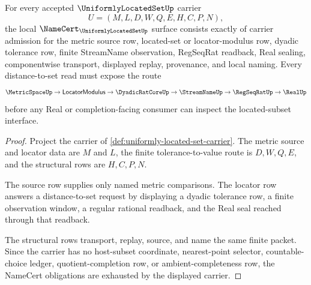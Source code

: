\begin{theorem}
\label{thm:uniformly-located-set-namecert-obligations}
For every accepted $\UniformlyLocatedSetUp$ carrier
$$
U=(M,L,D,W,Q,E,H,C,P,N),
$$
the local $\NameCert_{\UniformlyLocatedSetUp}$ surface consists exactly of carrier admission for the metric source row, located-set or locator-modulus row, dyadic tolerance row, finite StreamName observation, RegSeqRat readback, Real sealing, componentwise transport, displayed replay, provenance, and local naming. Every distance-to-set read must expose the route
$$
\MetricSpaceUp \to \mathsf{LocatorModulus} \to \DyadicRatCoreUp \to \StreamNameUp \to \RegSeqRatUp \to \RealUp
$$
before any Real or completion-facing consumer can inspect the located-subset interface.
\end{theorem}
\begin{proof}
Project the carrier of \autoref{def:uniformly-located-set-carrier}. The metric source and locator data are $M$ and $L$, the finite tolerance-to-value route is $D,W,Q,E$, and the structural rows are $H,C,P,N$.

The source row supplies only named metric comparisons. The locator row answers a distance-to-set request by displaying a dyadic tolerance row, a finite observation window, a regular rational readback, and the Real seal reached through that readback.

The structural rows transport, replay, source, and name the same finite packet. Since the carrier has no host-subset coordinate, nearest-point selector, countable-choice ledger, quotient-completion row, or ambient-completeness row, the NameCert obligations are exhausted by the displayed carrier.
\end{proof}

